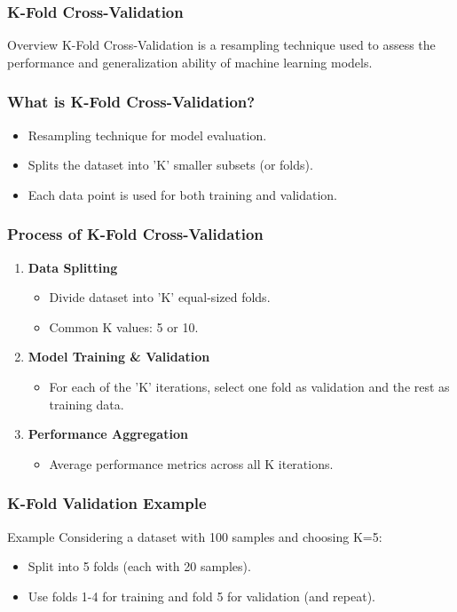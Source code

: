 \documentclass[aspectratio=169]{beamer}
\begin{document}
\begin{frame}[fragile]
    \frametitle{K-Fold Cross-Validation}
    \begin{block}{Overview}
        K-Fold Cross-Validation is a resampling technique used to assess the performance and generalization ability of machine learning models.
    \end{block}
\end{frame}

\begin{frame}[fragile]
    \frametitle{What is K-Fold Cross-Validation?}
    \begin{itemize}
        \item Resampling technique for model evaluation.
        \item Splits the dataset into 'K' smaller subsets (or folds).
        \item Each data point is used for both training and validation.
    \end{itemize}
\end{frame}

\begin{frame}[fragile]
    \frametitle{Process of K-Fold Cross-Validation}
    \begin{enumerate}
        \item \textbf{Data Splitting}
            \begin{itemize}
                \item Divide dataset into 'K' equal-sized folds.
                \item Common K values: 5 or 10.
            \end{itemize}
        \item \textbf{Model Training \& Validation}
            \begin{itemize}
                \item For each of the 'K' iterations, select one fold as validation and the rest as training data.
            \end{itemize}
        \item \textbf{Performance Aggregation}
            \begin{itemize}
                \item Average performance metrics across all K iterations.
            \end{itemize}
    \end{enumerate}
\end{frame}

\begin{frame}[fragile]
    \frametitle{K-Fold Validation Example}
    \begin{block}{Example}
        Considering a dataset with 100 samples and choosing K=5:
        \begin{itemize}
            \item Split into 5 folds (each with 20 samples).
            \item Use folds 1-4 for training and fold 5 for validation (and repeat).
        \end{itemize}
    \end{block}
\end{frame}
\end{document}
